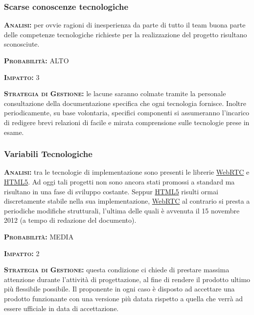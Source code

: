 \subsubsection{Scarse conoscenze tecnologiche}
\begin{description}
	\item{\scshape\bfseries Analisi:} per ovvie ragioni di inesperienza da parte di tutto il team buona parte delle competenze tecnologiche richieste per la realizzazione del progetto risultano sconosciute.
	\item{\scshape\bfseries Probabilità:} ALTO
	\item{\scshape\bfseries Impatto:} 3
	\item{\scshape\bfseries Strategia di Gestione:} le lacune saranno colmate tramite la personale consultazione della documentazione specifica che ogni tecnologia fornisce. Inoltre periodicamente, su base volontaria, specifici componenti si assumeranno l'incarico di redigere brevi relazioni di facile e mirata comprensione sulle tecnologie prese in esame.
\end{description}

\subsubsection{Variabili Tecnologiche}

\begin{description}
	\item{\scshape\bfseries Analisi:} tra le tecnologie di implementazione sono presenti le librerie \underline{WebRTC} e \underline{HTML5}. Ad oggi tali progetti non sono ancora stati promossi a standard ma risultano in una fase di sviluppo costante. Seppur \underline{HTML5} risulti ormai discretamente stabile nella sua implementazione, \underline{WebRTC} al contrario si presta a periodiche modifiche strutturali, l'ultima delle quali è avvenuta il 15 novembre 2012 (a tempo di redazione del documento).
	\item{\scshape\bfseries Probabilità:} MEDIA
	\item{\scshape\bfseries Impatto:} 2
	\item{\scshape\bfseries Strategia di Gestione:} questa condizione ci chiede di prestare massima attenzione durante l'attività di progettazione, al fine di rendere il prodotto ultimo più flessibile possibile. Il proponente in ogni caso è disposto ad accettare una prodotto funzionante con una versione più datata rispetto a quella che verrà ad essere ufficiale in data di accettazione.
\end{description}

